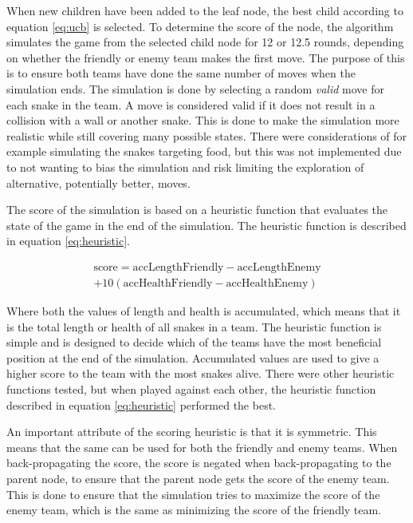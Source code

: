 \documentclass[a4paper,12pt]{article}
\begin{document}
When new children have been added to the leaf node, the best child according to equation \ref{eq:ucb} is selected. To determine the score of the node, the algorithm simulates the game from the selected child node for 12 or 12.5 rounds, depending on whether the friendly or enemy team makes the first move. The purpose of this is to ensure both teams have done the same number of moves when the simulation ends. The simulation is done by selecting a random \textit{valid} move for each snake in the team. A move is considered valid if it does not result in a collision with a wall or another snake. This is done to make the simulation more realistic while still covering many possible states. There were considerations of for example simulating the snakes targeting food, but this was not implemented due to not wanting to bias the simulation and risk limiting the exploration of alternative, potentially better, moves.


The score of the simulation is based on a heuristic function that evaluates the state of the game in the end of the simulation. The heuristic function is described in equation \ref{eq:heuristic}.


\begin{multline} \label{eq:heuristic}
    \text{score} = \text{accLengthFriendly} - \text{accLengthEnemy}\\ + 10 (\text{accHealthFriendly} - \text{accHealthEnemy})
\end{multline}

Where both the values of length and health is accumulated, which means that it is the total length or health of all snakes in a team. The heuristic function is simple and is designed to decide which of the teams have the most beneficial position at the end of the simulation. Accumulated values are used to give a higher score to the team with the most snakes alive. There were other heuristic functions tested, but when played against each other, the heuristic function described in equation \ref{eq:heuristic} performed the best.

An important attribute of the scoring heuristic is that it is symmetric. This means that the same can be used for both the friendly and enemy teams. When back-propagating the score, the score is negated when back-propagating to the parent node, to ensure that the parent node gets the score of the enemy team. This is done to ensure that the simulation tries to maximize the score of the enemy team, which is the same as minimizing the score of the friendly team.
\end{document}
